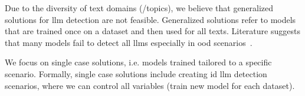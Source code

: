 Due to the diversity of text domains (/topics), we believe that generalized solutions for \ac{llm} detection are not feasible.
Generalized solutions refer to models that are trained once on a dataset and then used for all texts.
Literature suggests that many models fail to detect all \acp{llm} especially in \ac{ood} scenarios~\cite{bhattacharjee_fighting_2024,li_learning_2025}.

We focus on single case solutions, i.e. models trained tailored to a specific scenario.
Formally, single case solutions include creating \ac{id} \ac{llm} detection scenarios, 
where we can control all variables (train new model for each dataset).